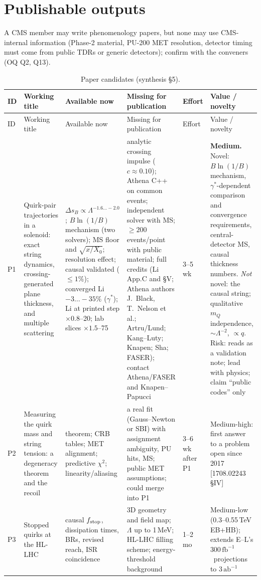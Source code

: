 \documentclass[11pt,a4paper]{article}
\newcommand{\mQ}{m_Q}
\newcommand{\fbinv}{\ensuremath{\,\mathrm{fb}^{-1}}}
\newcommand{\abinv}{\ensuremath{\,\mathrm{ab}^{-1}}}
\newcommand{\gst}{\gamma^*}
\newcommand{\Ds}{\Delta s}
\begin{document}
\section{Publishable outputs}\label{sec:papers}
A CMS member may write phenomenology papers, but none may use CMS-internal information (Phase-2 material, PU-200 MET resolution, detector timing must come from public TDRs or generic detectors); confirm with the conveners (OQ Q2, Q13).
{\footnotesize
\begin{longtable}{@{}L{0.6cm}L{3.1cm}L{4.1cm}L{3.8cm}L{1.3cm}L{2.6cm}@{}}
\caption{Paper candidates (synthesis \S5).}\label{tab:papers}\\
\toprule ID & Working title & Available now & Missing for publication & Effort & Value / novelty\\\midrule\endfirsthead
\toprule ID & Working title & Available now & Missing for publication & Effort & Value / novelty\\\midrule\endhead
\bottomrule\endfoot
P1 & Quirk-pair trajectories in a solenoid: exact string dynamics, crossing-generated plane thickness, and multiple scattering & $\Ds_B\propto\Lambda^{-1.6\ldots-2.0}$; $B\ln(1/B)$ mechanism (two solvers); MS floor and $\sqrt{x/X_0}$; resolution effect; causal validated ($\le1\%$); converged Li $-3\ldots-35\%$ ($\gst$); Li at printed step $\times0.8$--20; lab slices $\times1.5$--75 & analytic crossing impulse ($c\approx0.10$); Athena C++ on common events; independent solver with MS; $\ge200$ events/point with public material; full credits (Li App.C and \S V; Athena authors J.~Black, T.~Nelson et al.; Artru/Lund; Kang--Luty; Knapen; Sha; FASER); contact Athena/FASER and Knapen--Papucci & 3--5 wk & \textbf{Medium.} Novel: $B\ln(1/B)$ mechanism, $\gst$-dependent comparison and convergence requirements, central-detector MS, causal thickness numbers. \emph{Not} novel: the causal string; qualitative $\mQ$ independence, $\sim\Lambda^{-2}$, $\propto q$. Risk: reads as a validation note; lead with physics; claim ``public codes'' only\\
P2 & Measuring the quirk mass and string tension: a degeneracy theorem and the recoil & theorem; CRB tables; MET alignment; predictive $\chi^2$; linearity/aliasing & a real fit (Gauss--Newton or SBI) with assignment ambiguity, PU hits, MS; public MET assumptions; could merge into P1 & 3--6 wk after P1 & Medium-high: first answer to a problem open since 2017 [1708.02243 \S IV]\\
P3 & Stopped quirks at the HL-LHC & causal $f_{\rm stop}$, dissipation times, BRs, revised reach, ISR coincidence & 3D geometry and field map; $\Lambda$ up to 1\,MeV; HL-LHC filling scheme; energy-threshold background & 1--2 mo & Medium-low (0.3--0.55\,TeV EB+HB); extends E--L's 300\fbinv\ projections to 3\abinv\\

\end{longtable}}
\end{document}
